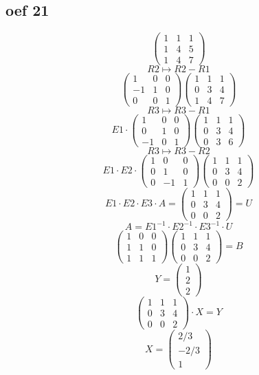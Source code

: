 \documentclass[10pt,a4paper]{article}
\begin{document}
\subsection*{oef 21}
\[
\begin{pmatrix}
1 & 1 & 1\\
1 & 4 & 5\\
1 & 4 & 7
\end{pmatrix}
\]
\[R2 \longmapsto R2-R1\]
\[
\begin{pmatrix}
1 & 0 & 0\\
-1 & 1 & 0\\
0 & 0 & 1
\end{pmatrix}
\begin{pmatrix}
1 & 1 & 1\\
0 & 3 & 4\\
1 & 4 & 7
\end{pmatrix}
\]
\[R3 \longmapsto R3-R1\]
\[ E1 \cdot
\begin{pmatrix}
1 & 0 & 0\\
0 & 1 & 0\\
-1 & 0 & 1
\end{pmatrix}
\begin{pmatrix}
1 & 1 & 1\\
0 & 3 & 4\\
0 & 3 & 6
\end{pmatrix}
\]
\[R3 \longmapsto R3-R2\]
\[ E1 \cdot E2 \cdot
\begin{pmatrix}
1 & 0 & 0\\
0 & 1 & 0\\
0 & -1 & 1
\end{pmatrix}
\begin{pmatrix}
1 & 1 & 1\\
0 & 3 & 4\\
0 & 0 & 2
\end{pmatrix}
\]
\[\]
\[E1 \cdot E2 \cdot E3 \cdot A = 
\begin{pmatrix}
1 & 1 & 1\\
0 & 3 & 4\\
0 & 0 & 2
\end{pmatrix}
= U \]
\[A = E1^{-1} \cdot E2^{-1} \cdot E3^{-1} \cdot U\]
\[
\begin{pmatrix}
1 & 0 & 0\\
1 & 1 & 0\\
1 & 1 & 1
\end{pmatrix}
\begin{pmatrix}
1 & 1 & 1\\
0 & 3 & 4\\
0 & 0 & 2
\end{pmatrix}
= B\]
\[ Y =
\begin{pmatrix}
1 \\
2 \\
2 
\end{pmatrix}
\]
\[
\begin{pmatrix}
1 & 1 & 1\\
0 & 3 & 4\\
0 & 0 & 2
\end{pmatrix}
\cdot X = Y\]
\[ X =
\begin{pmatrix}
2/3\\
-2/3\\
1
\end{pmatrix}
\]
\end{document}
